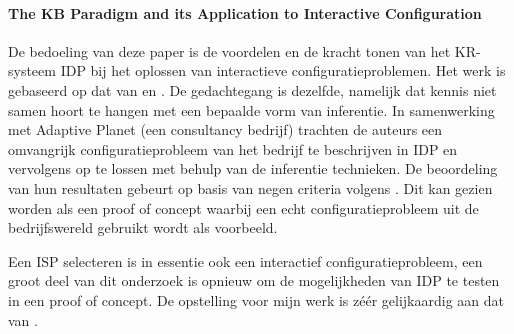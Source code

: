 \paragraph{The KB Paradigm and its Application to Interactive Configuration \cite{van2016kb}}
De bedoeling van deze paper is de voordelen en de kracht tonen van het KR-systeem IDP bij het oplossen van interactieve configuratieproblemen. Het werk is gebaseerd op dat van \citep{de2014separating} en \citep{denecker2008building}. De gedachtegang is dezelfde, namelijk dat kennis niet samen hoort te hangen met een bepaalde vorm van inferentie. In samenwerking met Adaptive Planet (een consultancy bedrijf) trachten de auteurs een omvangrijk configuratieprobleem van het bedrijf te beschrijven in IDP en vervolgens op te lossen met behulp van de inferentie technieken. De beoordeling van hun resultaten gebeurt op basis van negen criteria volgens \citep{felfernig2001intelligent}. Dit kan gezien worden als een proof of concept waarbij een echt configuratieprobleem uit de bedrijfswereld gebruikt wordt als voorbeeld. 

Een ISP selecteren is in essentie ook een interactief configuratieprobleem, een groot deel van dit onderzoek is opnieuw om de mogelijkheden van IDP te testen in een proof of concept. De opstelling voor mijn werk is z\'{e}\'{e}r gelijkaardig aan dat van \citep{van2016kb}. 

